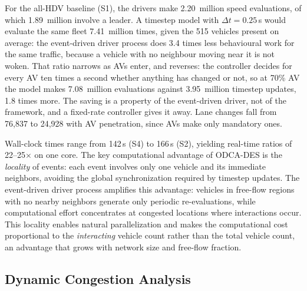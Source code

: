 \documentclass[review,authoryear]{elsarticle}
\begin{document}
For the all-HDV baseline (S1), the drivers make 2.20~million speed evaluations, of which 1.89~million involve a leader. A timestep model with $\Delta t = 0.25$\,s would evaluate the same fleet 7.41~million times, given the 515 vehicles present on average: the event-driven driver process does 3.4 times less behavioural work for the same traffic, because a vehicle with no neighbour moving near it is not woken. That ratio narrows as AVs enter, and reverses: the controller decides for every AV ten times a second whether anything has changed or not, so at 70\% AV the model makes 7.08~million evaluations against 3.95~million timestep updates, 1.8 times more. The saving is a property of the event-driven driver, not of the framework, and a fixed-rate controller gives it away. Lane changes fall from 76{,}837 to 24{,}928 with AV penetration, since AVs make only mandatory ones.

Wall-clock times range from 142\,s (S4) to 166\,s (S2), yielding real-time ratios of 22--25$\times$ on one core. The key computational advantage of ODCA-DES is the \emph{locality} of events: each event involves only one vehicle and its immediate neighbors, avoiding the global synchronization required by timestep updates. The event-driven driver process amplifies this advantage: vehicles in free-flow regions with no nearby neighbors generate only periodic re-evaluations, while computational effort concentrates at congested locations where interactions occur. This locality enables natural parallelization and makes the computational cost proportional to the \emph{interacting} vehicle count rather than the total vehicle count, an advantage that grows with network size and free-flow fraction.


\subsection{Dynamic Congestion Analysis}
\label{sec:exp_incident}
\end{document}

